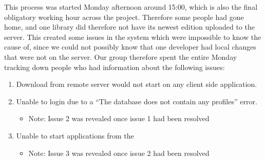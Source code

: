 This process was started Monday afternoon around 15:00, which is also the final obligatory working hour across the project. Therefore some people had gone home, and one library did therefore not have its newest edition uploaded to the server. This created some issues in the system which were impossible to know the cause of, since we could not possibly know that one developer had local changes that were not on the server. Our group therefore spent the entire Monday tracking down people who had information about the following issues:


\begin{enumerate}
    \item Download from remote server would not start on any client side application.
    \item Unable to login due to a ``The database does not contain any profiles'' error.
    \begin{itemize}
        \item Note: Issue 2 was revealed once issue 1 had been resolved
    \end{itemize}
    \item Unable to start applications from the \launcher  
    \begin{itemize}
        \item Note: Issue 3 was revealed once issue 2 had been resolved
    \end{itemize}
\end{enumerate}


